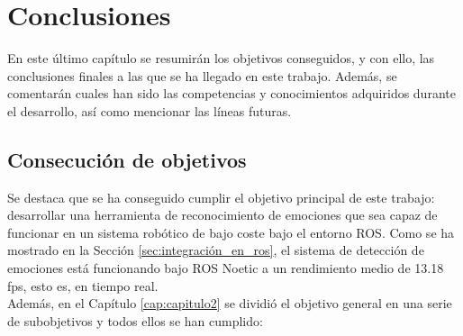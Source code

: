 \chapter{Conclusiones}
\label{cap:capitulo6}

En este último capítulo se resumirán los objetivos conseguidos, y con ello, las conclusiones finales a las que se ha llegado en este trabajo. Además, se comentarán cuales han sido las competencias y conocimientos adquiridos durante el desarrollo, así como mencionar las líneas futuras.

\section{Consecución de objetivos}

Se destaca que se ha conseguido cumplir el objetivo principal de este trabajo: desarrollar una herramienta de reconocimiento de emociones que sea capaz de funcionar en un sistema robótico de bajo coste bajo el entorno ROS. Como se ha mostrado en la Sección \ref{sec:integración_en_ros}, el sistema de detección de emociones está funcionando bajo ROS Noetic a un rendimiento medio de 13.18 fps, esto es, en tiempo real.\\

Además, en el Capítulo \ref{cap:capitulo2} se dividió el objetivo general en una serie de subobjetivos y todos ellos se han cumplido:


